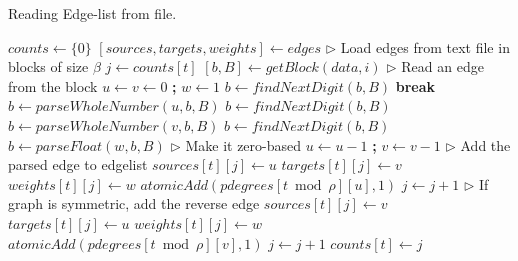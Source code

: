 \begin{algorithm}[hbtp]
\caption{Reading Edge-list from file.}
\label{alg:el}
\begin{algorithmic}[1]

\Statex

 \label{alg:el--read-edgelist-begin}
  \State $counts \gets \{0\}$ \label{alg:el--initialize-begin}
  \State $[sources, targets, weights] \gets edges$ \label{alg:el--initialize-end}
  \State $\rhd$ Load edges from text file in blocks of size $\beta$
   \label{alg:el--blocks-begin}
    \State $j \gets counts[t]$
    \State $[b, B] \gets getBlock(data, i)$ \label{alg:el--get-block}
     \label{alg:el--block-begin}
      \State $\rhd$ Read an edge from the block
      \State $u \gets v \gets 0$ \textbf{;} $w \gets 1$ \label{alg:el--parse-edge-begin}
      \State $b \gets findNextDigit(b, B)$
       \textbf{break}
      \EndIf
      \State $b \gets parseWholeNumber(u, b, B)$
      \State $b \gets findNextDigit(b, B)$
      \State $b \gets parseWholeNumber(v, b, B)$
        \State $b \gets findNextDigit(b, B)$
        \State $b \gets parseFloat(w, b, B)$
      \EndIf \label{alg:el--parse-edge-end}
      \State $\rhd$ Make it zero-based
      \State $u \gets u - 1$ \textbf{;} $v \gets v - 1$ \label{alg:el--base1}
      \State $\rhd$ Add the parsed edge to edgelist
      \State $sources[t][j] \gets u$ \label{alg:el--add-edge-begin}
      \State $targets[t][j] \gets v$
       $weights[t][j] \gets w$
      \EndIf
      \State $atomicAdd(pdegrees[t \bmod \rho][u], 1)$ \label{alg:el--update-degrees}
      \State $j \gets j + 1$ \label{alg:el--add-edge-end}
      \State $\rhd$ If graph is symmetric, add the reverse edge
       \label{alg:el--reverse-edge-begin}
        \State $sources[t][j] \gets v$
        \State $targets[t][j] \gets u$
         $weights[t][j] \gets w$
        \EndIf
        \State $atomicAdd(pdegrees[t \bmod \rho][v], 1)$
        \State $j \gets j + 1$
      \EndIf \label{alg:el--reverse-edge-end}
    \EndWhile \label{alg:el--block-end}
    \State $counts[t] \gets j$ \label{alg:el--update-counts}
  \EndFor \label{alg:el--blocks-end}
   \label{alg:el--return-counts}
\EndFunction \label{alg:el--read-edgelist-end}


\end{algorithmic}
\end{algorithm}
